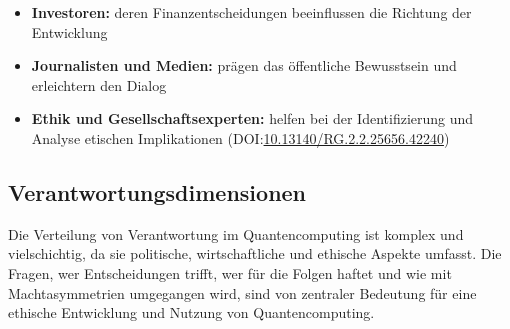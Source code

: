     \begin{itemize}
        \item \textbf{Investoren:} deren Finanzentscheidungen beeinflussen die Richtung der Entwicklung
        \item \textbf{Journalisten und Medien:} prägen das öffentliche Bewusstsein und erleichtern den Dialog
        \item \textbf{Ethik und Gesellschaftsexperten: }helfen bei der Identifizierung und Analyse etischen Implikationen
\cite{Communities of Quantum Technologies: Stakeholder Identification, Legitimation, and Interaction}
(DOI:\href{http://dx.doi.org/10.13140/RG.2.2.25656.42240}{10.13140/RG.2.2.25656.42240})    \end{itemize}



\subsection{Verantwortungsdimensionen}
Die Verteilung von Verantwortung im Quantencomputing ist komplex und vielschichtig, da sie politische, wirtschaftliche und ethische Aspekte umfasst. Die Fragen, wer Entscheidungen trifft, wer für die Folgen haftet und wie mit Machtasymmetrien umgegangen wird, sind von zentraler Bedeutung für eine ethische Entwicklung und Nutzung von Quantencomputing.

